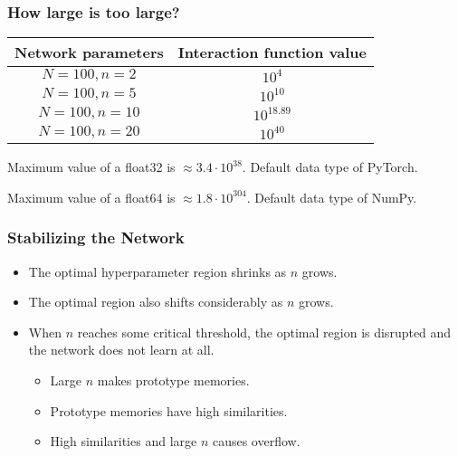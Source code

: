 \begin{frame}
    \frametitle{How large is too large?}

    \begin{center}
        \begin{tabular}{| c | c |}
            \hline
            Network parameters & Interaction function value \\
            \hline
            \hline
            \(N=100, n=2\) & \(10^{4}\) \\
            \hline
            \(N=100, n=5\) & \(10^{10}\) \\
            \hline
            \(N=100, n=10\) & \(10^{18.89}\) \\
            \hline
            \(N=100, n=20\) & \(10^{40}\) \\
            \hline
        \end{tabular}
    \end{center}

    \pause
    Maximum value of a float32 is \(\approx 3.4 \cdot 10^{38}\). Default data type of PyTorch.

    \pause
    Maximum value of a float64 is \(\approx 1.8 \cdot 10^{304}\). Default data type of NumPy.
\end{frame}

\begin{frame}
    \frametitle{Stabilizing the Network}
    
    \begin{itemize}
        \item The optimal hyperparameter region shrinks as \(n\) grows.
        \pause
        \item The optimal region also shifts considerably as \(n\) grows.
        \pause
        \item When \(n\) reaches some critical threshold, the optimal region is disrupted and the network does not learn at all.
        \pause
        \begin{itemize}
            \item Large \(n\) makes prototype memories.
            \item Prototype memories have high similarities.
            \item High similarities and large \(n\) causes overflow.
        \end{itemize}
    \end{itemize}    
\end{frame}
    

